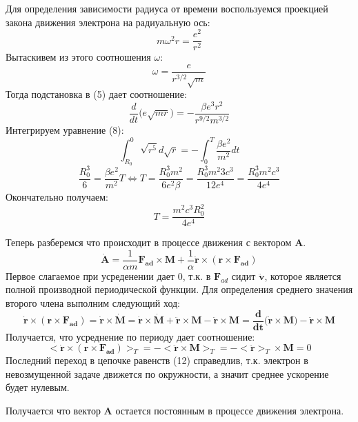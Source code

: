 \documentclass[12pt]{article}
\begin{document}
  	Для определения зависимости радиуса от времени воспользуемся проекцией закона движения электрона на радиуальную ось:
  	\begin{equation}
  		m\omega^2 r = \frac{e^2}{r^2}
  	\end{equation}
  	Вытаскивем из этого соотношения $\omega$:
  	\begin{equation}
  		\omega = \frac{e}{r^{3/2}\sqrt{m} }
  	\end{equation}
  	Тогда подстановка в (5) дает соотношение:
  	\begin{equation}
  		\frac{d}{dt}\Big(e\sqrt{mr}\Big) = -\frac{\beta e^3r^2}{r^{9/2}m^{3/2}}
  	\end{equation}
  	Интегрируем уравнение (8):
  	\begin{equation}
  		\int_{R_0}^{0} \sqrt{r^5} d\sqrt{r} = -\int_0^{T} \frac{\beta e^2}{m^2} dt
  	\end{equation}
  	\begin{equation}
  		\frac{R_0^3}{6} = \frac{\beta e^2}{m^2}T \Leftrightarrow T = \frac{R_0^3m^2}{6e^2\beta} = \frac{R_0^3 m^2 3c^3}{12 e^4} = \frac{R_0^3 m^2c^3}{4e^4}
  	\end{equation}
  	Окончательно получаем:
  	\[\boxed{T = \frac{m^2c^3R_0^2}{4e^4}}\]
  	
  	
  	Теперь разберемся что происходит в процессе движения с вектором $\mathbf{A}$.
  	\begin{equation}
  		\mathbf{\dot{A} = }\frac{1}{\alpha m} \mathbf{F_{ad} \times M} + \frac{1}{\alpha} \mathbf{\dot{r}\times(r\times F_{ad}) }
  	\end{equation}
  	Первое слагаемое при усреденении дает 0, т.к. в $\mathbf{F}_{ad}$ сидит $\mathbf{\ddot{v}}$, которое является полной производной периодической функции. Для определения среднего значения второго члена выполним следующий ход:
  	\[\mathbf{\dot{r}\times (r\times F_{ad}) = \dot{r}\times \dot{M} = \dot{r}\times \dot{M} + \ddot{r} \times M - \ddot{r} \times M = \frac{d}{dt}\Big( \dot{r} \times M \Big)  - \ddot{r}\times M }\]
  	Получается, что усреднение по периоду дает соотношение:
  	\begin{equation}
  		\Big<\mathbf{\dot{r}\times (r\times F_{ad})}\Big>_T = -\Big<\mathbf{\ddot{r}\times M}\Big>_T = -\Big<\mathbf{\ddot{r}}\Big>_T\times \mathbf{M} = 0
  	\end{equation}
  	Последний переход в цепочке равенств (12) справедлив, т.к. электрон в невозмущенной задаче движется по окружности, а значит среднее ускорение будет нулевым.
  	
  	
  	Получается что вектор $\mathbf{A}$ остается постоянным в процессе движения электрона.
\end{document}
